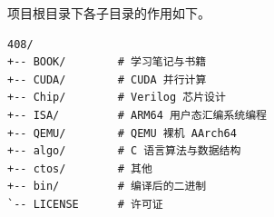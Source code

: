 项目根目录下各子目录的作用如下。

\vspace{1em}

\begin{verbatim}
408/
+-- BOOK/        # 学习笔记与书籍
+-- CUDA/        # CUDA 并行计算
+-- Chip/        # Verilog 芯片设计
+-- ISA/         # ARM64 用户态汇编系统编程
+-- QEMU/        # QEMU 裸机 AArch64
+-- algo/        # C 语言算法与数据结构
+-- ctos/        # 其他
+-- bin/         # 编译后的二进制
`-- LICENSE      # 许可证
\end{verbatim}
